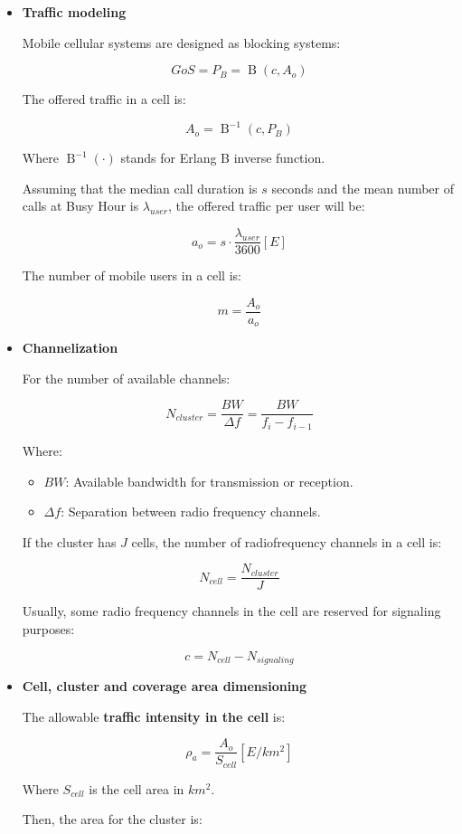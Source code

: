 \documentclass[../main.tex]{subfiles}
\begin{document}
\begin{itemize}
	\item {
		\textbf{Traffic modeling}

		Mobile cellular systems are designed as blocking systems:

		$$
			GoS = P_B = \operatorname{B}(c, A_o)
		$$

		The offered traffic in a cell is:

		$$
			A_o = \operatorname{B}^{-1} (c, P_B)
		$$
		
		Where $\operatorname{B}^{-1}(\cdot)$ stands for Erlang B inverse function.

		Assuming that the median call duration is $s$ seconds and the mean number of calls at Busy Hour is $\lambda_{user}$, the offered traffic per user will be:

		$$
			a_o = s \cdot \frac {\lambda_{user}} {3600} [E]
		$$

		The number of mobile users in a cell is:

		$$
			m = \frac {A_o} {a_o}
		$$
	}
	\item {
		\textbf{Channelization}

		For the number of available channels:

		$$
			N_{cluster} = \frac {BW} {\Delta f} = \frac {BW} {f_{i} -  f_{i-1}}
		$$

		Where:
		\begin{itemize}
			\item $BW$: Available bandwidth for transmission or reception.
			\item $\Delta f$: Separation between radio frequency channels.
		\end{itemize}

		If the cluster has $J$ cells, the number of radiofrequency channels in a cell is:

		$$
			N_{cell} = \frac {N_{cluster}} {J}
		$$

		Usually, some radio frequency channels in the cell are reserved for signaling purposes:

		$$
			c = N_{cell} - N_{signaling}
		$$
	}
	\item {
		\textbf{Cell, cluster and coverage area dimensioning}

		The allowable \textbf{traffic intensity in the cell} is:

		$$
			\rho_a = \frac {A_o} {S_{cell}} [E / km^2]
		$$

		Where $S_{cell}$ is the cell area in $km^2$.

		Then, the area for the cluster is:

}
\end{itemize}
\end{document}
